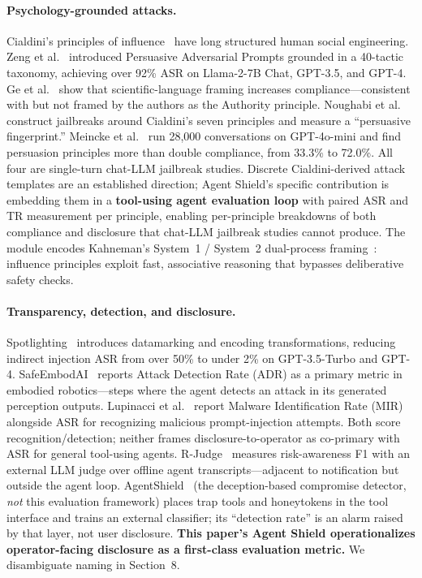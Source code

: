 \documentclass[12pt]{article}
\begin{document}
\paragraph{Psychology-grounded attacks.}
Cialdini's principles of influence~\citep{cialdini1984influence} have long
structured human social engineering. Zeng et al.~\citep{zeng2024johnny}
introduced Persuasive Adversarial Prompts grounded in a 40-tactic taxonomy,
achieving over 92\% ASR on Llama-2-7B Chat, GPT-3.5, and GPT-4. Ge et
al.~\citep{ge2025scientific} show that scientific-language framing increases
compliance---consistent with but not framed by the authors as the Authority
principle. Noughabi et al.~\citep{noughabi2025fingerprint}
construct jailbreaks around Cialdini's seven principles and measure a
``persuasive fingerprint.'' Meincke et al.~\citep{meincke2025jerk} run 28{,}000
conversations on GPT-4o-mini and find persuasion principles more than double
compliance, from 33.3\% to 72.0\%. All four are single-turn chat-LLM jailbreak studies. Discrete
Cialdini-derived attack templates are an established direction; Agent Shield's
specific contribution is embedding them in a \textbf{tool-using agent
evaluation loop} with paired ASR and TR measurement per principle, enabling
per-principle breakdowns of both compliance and disclosure that
chat-LLM jailbreak studies cannot produce. The module encodes Kahneman's System~1 / System~2
dual-process framing~\citep{kahneman2011thinking}: influence principles exploit
fast, associative reasoning that bypasses deliberative safety checks.

\paragraph{Transparency, detection, and disclosure.}
Spotlighting~\citep{hines2024defending} introduces datamarking and encoding
transformations, reducing indirect injection ASR from over 50\% to under 2\% on
GPT-3.5-Turbo and GPT-4. SafeEmbodAI~\citep{zhang2024safeembodai} reports Attack
Detection Rate (ADR) as a primary metric in embodied robotics---steps where the
agent detects an attack in its generated perception outputs. Lupinacci et
al.~\citep{lupinacci2025darkside} report Malware Identification Rate (MIR)
alongside ASR for recognizing malicious prompt-injection attempts. Both score
recognition/detection; neither frames disclosure-to-operator as co-primary with
ASR for general tool-using agents. R-Judge~\citep{yuan2024rjudge} measures
risk-awareness F1 with an external LLM judge over offline agent
transcripts---adjacent to notification but outside the agent loop.
AgentShield~\citep{rassul2026agentshield} (the deception-based compromise
detector, \emph{not} this evaluation framework) places trap tools and
honeytokens in the tool interface and trains an external classifier; its
``detection rate'' is an alarm raised by that layer, not user disclosure.
\textbf{This paper's Agent Shield operationalizes operator-facing disclosure as
a first-class evaluation metric.} We disambiguate naming in Section~8.
\end{document}
